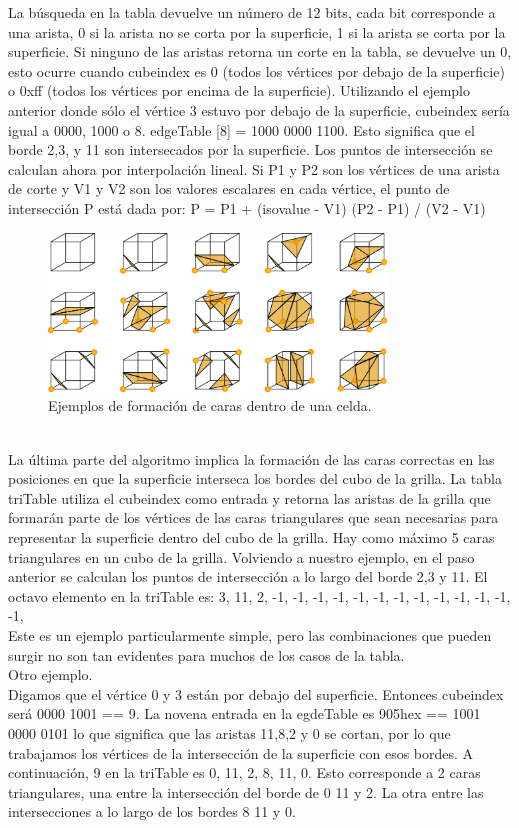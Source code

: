 \documentclass[12pt]{article}
\begin{document}
La búsqueda en la tabla devuelve un número de 12 bits, cada bit corresponde a una arista, 0 si la arista no se corta por la superficie, 1 si la arista se corta por la superficie. Si ninguno de las aristas retorna un corte en la tabla, se devuelve un 0, esto ocurre cuando cubeindex es 0 (todos los vértices por debajo de la superficie) o 0xff (todos los vértices por encima de la superficie).
Utilizando el ejemplo anterior donde sólo el vértice 3 estuvo por debajo de la superficie, cubeindex sería igual a 0000, 1000 o 8. edgeTable [8] = 1000 0000 1100. Esto significa que el borde 2,3, y 11 son intersecados por la superficie.
Los puntos de intersección se calculan ahora por interpolación lineal. Si P1 y P2 son los vértices de una arista de corte y V1 y V2 son los valores escalares en cada vértice, el punto de intersección P está dada por:
P = P1 + (isovalue - V1) (P2 - P1) / (V2 - V1)
\begin{figure}[h!]
\includegraphics[width=0.8\textwidth,center]{marchingcubes3.png}
\caption{Ejemplos de formación de caras dentro de una celda.}
\end{figure}
\\La última parte del algoritmo implica la formación de las caras correctas en las posiciones en que la superficie interseca los bordes del cubo de la grilla. La tabla triTable utiliza el cubeindex como entrada y retorna las aristas de la grilla que  formarán parte de los vértices de las caras triangulares que sean necesarias para representar la superficie dentro del cubo de la grilla. Hay como máximo 5 caras triangulares en un cubo de la grilla.
Volviendo a nuestro ejemplo, en el paso anterior se calculan los puntos de intersección a lo largo del borde 2,3 y 11. El octavo elemento en la triTable es:
{3, 11, 2, -1, -1, -1, -1, -1, -1, -1, -1, -1, -1, -1, -1, -1},
\\Este es un ejemplo particularmente simple, pero las combinaciones que pueden surgir no son tan evidentes para muchos de los casos de la tabla.
\\Otro ejemplo.
\\Digamos que el vértice 0 y 3 están por debajo del superficie. Entonces cubeindex será 0000 1001 == 9. La novena entrada en la egdeTable es 905hex == 1001 0000 0101 lo que significa que las aristas 11,8,2 y 0 se cortan, por lo que trabajamos los vértices de la intersección de la superficie con esos bordes.
A continuación, 9 en la triTable es 0, 11, 2, 8, 11, 0. Esto corresponde a 2 caras triangulares, una entre la intersección del borde de 0 11 y 2. La otra entre las intersecciones a lo largo de los bordes 8 11 y 0.
\end{document}
